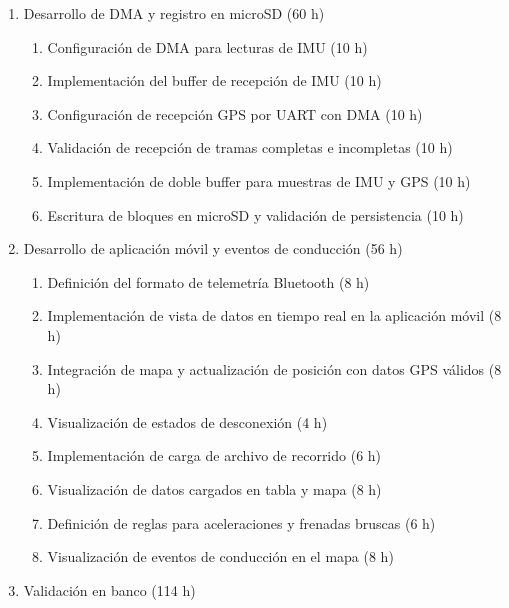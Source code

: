 \documentclass[
11pt, %
]{charter}
\begin{document}
\begin{enumerate}
\begin{enumerate}
		\item Configuración de UART e implementación del parser básico de tramas (12 h)
		\item Registro de latitud, longitud y velocidad en microSD (10 h)
		\item Configuración del sensor de temperatura (6 h)
		\item Implementación de lectura de temperatura (6 h)
		\item Registro de temperatura y comparación contra referencia de banco (6 h)
	\end{enumerate}
	\item Desarrollo de DMA y registro en microSD (60 h)
	\begin{enumerate}
		\item Configuración de DMA para lecturas de IMU (10 h)
		\item Implementación del buffer de recepción de IMU (10 h)
		\item Configuración de recepción GPS por UART con DMA (10 h)
		\item Validación de recepción de tramas completas e incompletas (10 h)
		\item Implementación de doble buffer para muestras de IMU y GPS (10 h)
		\item Escritura de bloques en microSD y validación de persistencia (10 h)
	\end{enumerate}
	\item Desarrollo de aplicación móvil y eventos de conducción (56 h)
	\begin{enumerate}
		\item Definición del formato de telemetría Bluetooth (8 h)
		\item Implementación de vista de datos en tiempo real en la aplicación móvil (8 h)
		\item Integración de mapa y actualización de posición con datos GPS válidos (8 h)
		\item Visualización de estados de desconexión (4 h)
		\item Implementación de carga de archivo de recorrido (6 h)
		\item Visualización de datos cargados en tabla y mapa (8 h)
		\item Definición de reglas para aceleraciones y frenadas bruscas (6 h)
		\item Visualización de eventos de conducción en el mapa (8 h)
	\end{enumerate}
	\item Validación en banco (114 h)

\end{enumerate}
\end{document}
